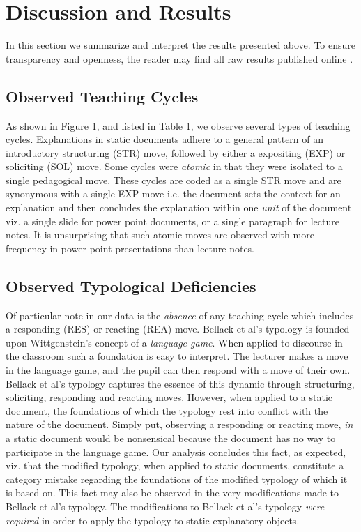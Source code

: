 \documentclass[conference]{IEEEtran}
\begin{document}
\section{Discussion and Results}
In this section we summarize and interpret the results presented above. To
ensure transparency and openness, the reader may find all raw results published
online .

\subsection{Observed Teaching Cycles}
As shown in Figure 1, and listed in Table 1, we observe several types of
teaching cycles. Explanations in static documents adhere to a general pattern of
an introductory structuring (STR) move, followed by either a expositing (EXP) or
soliciting (SOL) move. Some cycles were \emph{atomic} in that they were isolated
to a single pedagogical move. These cycles are coded as a single STR move and
are synonymous with a single EXP move i.e. the document sets the context for an
explanation and then concludes the explanation within one \emph{unit} of the
document viz. a single slide for power point documents, or a single paragraph
for lecture notes. It is unsurprising that such atomic moves are observed with
more frequency in power point presentations than lecture notes. 

\subsection{Observed Typological Deficiencies}
Of particular note in our data is the \emph{absence} of any teaching cycle which
includes a responding (RES) or reacting (REA) move. Bellack et al's typology is
founded upon Wittgenstein's concept of a \emph{language game}. When applied to
discourse in the classroom such a foundation is easy to interpret. The lecturer
makes a move in the language game, and the pupil can then respond with a move of
their own. Bellack et al's typology captures the essence of this dynamic through
structuring, soliciting, responding and reacting moves. However, when applied to
a static document, the foundations of which the typology rest into conflict with
the nature of the document. Simply put, observing a responding or reacting move,
\emph{in} a static document would be nonsensical because the document has no way
to participate in the language game. Our analysis concludes this fact, as
expected, viz. that the modified typology, when applied to static documents,
constitute a category mistake regarding the foundations of the modified typology
of which it is based on. This fact may also be observed in the very
modifications made to Bellack et al's typology. The modifications to Bellack et
al's typology \emph{were required} in order to apply the typology to static
explanatory objects.
\end{document}
